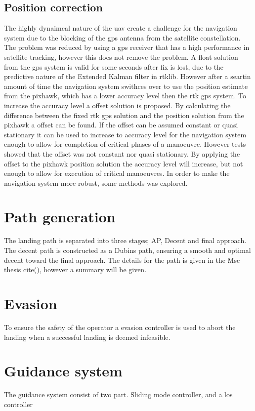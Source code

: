 \subsection{Position correction}%
The highly dynaimcal nature of the uav create a challenge for the navigation system due to the blocking of the gps antenna from the satellite constellation. The problem was reduced by using a gps receiver that has a high performance in satellite tracking, however this does not remove the problem. A float solution from the gps system is valid for some seconds after fix is lost, due to the predictive nature of the Extended Kalman filter in rtklib. However after a seartin amount of time the navigation system swithces over to use the position estimate from the pixhawk, which has a lower accuracy level then the rtk gps system. To increase the accuracy level a offset solution is proposed. By calculating the difference between the fixed rtk gps solution and the position solution from the pixhawk a offset can be found. If the offset can be assumed constant or quasi stationary it can be used to increase to accuracy level for the navigation system enough to allow for completion of critical phases of a manoeuvre. However tests showed that the offset was not constant nor quasi stationary. By applying the offset to the pixhawk position solution the accuracy level will increase, but not enough to allow for execution of critical manoeuvres.
In order to make the navigation system more robust, some methods was explored. 
\section{Path generation}
The landing path is separated into three stages; AP, Decent and final approach. The decent path is constructed as a Dubins path, ensuring a smooth and optimal decent toward the final approach. The details for the path is given in the Msc thesis cite(), however a summary will be given.

\section{Evasion}
To ensure the safety of the operator a evasion controller is used to abort the landing when a successful landing is deemed infeasible.

\section{Guidance system}
The guidance system consist of two part. Sliding mode controller, and a los controller

